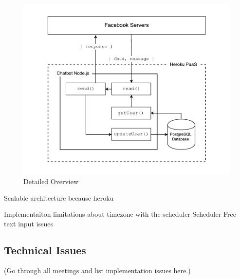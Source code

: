 \begin{figure}[H]
    \centering
    \includegraphics[width=6in]{../resources/diagrams/chatbot-detailed-overview.pdf}
    \caption{Detailed Overview}
    \label{fig:prototype_detailed_overview}
\end{figure}

Scalable architecture because heroku\newline

Implementaiton limitations about timezone with the scheduler\newline
Scheduler\newline
Free text input issues\newline

\subsection*{Technical Issues}
(Go through all meetings and list implementation issues here.)

